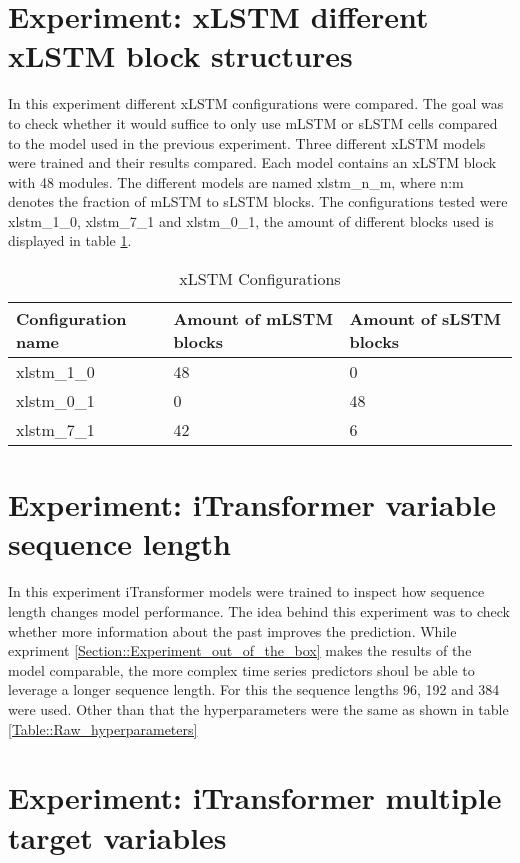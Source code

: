 \documentclass[class=scrbook, crop=false]{standalone}
\begin{document}
\section{Experiment: xLSTM different xLSTM block structures}
In this experiment different xLSTM configurations were compared. 
The goal was to check whether it would suffice to only use mLSTM or sLSTM cells compared to the model used in the previous experiment.
Three different xLSTM models were trained and their results compared.
Each model contains an xLSTM block with 48 modules.
The different models are named xlstm\_n\_m, where n:m denotes the fraction of mLSTM to sLSTM blocks.
The configurations tested were xlstm\_1\_0, xlstm\_7\_1 and xlstm\_0\_1, the amount of different blocks used is displayed in table \ref{Table::xLSTM_configuratiosn}. 

  \begin{table}[]
\centering
\begin{tabular}{l|l|l}
 Configuration name & Amount of mLSTM blocks & Amount of sLSTM blocks  \\\hline
 xlstm\_1\_0 & 48 & 0 \\
 xlstm\_0\_1 & 0 & 48 \\
 xlstm\_7\_1  & 42 & 6 
\end{tabular}
\caption{xLSTM Configurations}
\label{Table::xLSTM_configuratiosn}
\end{table}

\section{Experiment: iTransformer variable sequence length}
   
   In this experiment iTransformer models were trained to inspect how sequence length changes model performance.
   The idea behind this experiment was to check whether more information about the past improves the prediction.
   While expriment \ref{Section::Experiment_out_of_the_box} makes the results of the model comparable, the more complex time series predictors shoul be able to leverage a longer sequence length.
   For this the sequence lengths 96, 192 and 384 were used. Other than that the hyperparameters were the same as shown in table \ref{Table::Raw_hyperparameters}   
   
\section{Experiment: iTransformer multiple target variables}
\end{document}
